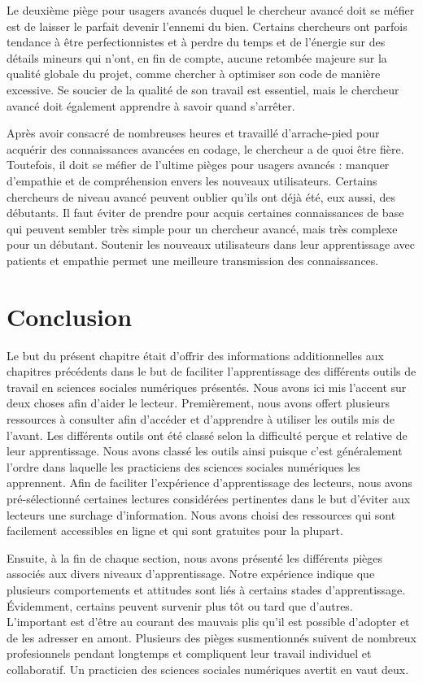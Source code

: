 \documentclass[
  letterpaper,
  DIV=11,
  numbers=noendperiod]{scrreprt}
\begin{document}
Le deuxième piège pour usagers avancés duquel le chercheur avancé doit
se méfier est de laisser le parfait devenir l'ennemi du bien. Certains
chercheurs ont parfois tendance à être perfectionnistes et à perdre du
temps et de l'énergie sur des détails mineurs qui n'ont, en fin de
compte, aucune retombée majeure sur la qualité globale du projet, comme
chercher à optimiser son code de manière excessive. Se soucier de la
qualité de son travail est essentiel, mais le chercheur avancé doit
également apprendre à savoir quand s'arrêter.

Après avoir consacré de nombreuses heures et travaillé d'arrache-pied
pour acquérir des connaissances avancées en codage, le chercheur a de
quoi être fière. Toutefois, il doit se méfier de l'ultime pièges pour
usagers avancés : manquer d'empathie et de compréhension envers les
nouveaux utilisateurs. Certains chercheurs de niveau avancé peuvent
oublier qu'ils ont déjà été, eux aussi, des débutants. Il faut éviter de
prendre pour acquis certaines connaissances de base qui peuvent sembler
très simple pour un chercheur avancé, mais très complexe pour un
débutant. Soutenir les nouveaux utilisateurs dans leur apprentissage
avec patients et empathie permet une meilleure transmission des
connaissances.

\section{Conclusion}\label{conclusion-3}

Le but du présent chapitre était d'offrir des informations
additionnelles aux chapitres précédents dans le but de faciliter
l'apprentissage des différents outils de travail en sciences sociales
numériques présentés. Nous avons ici mis l'accent sur deux choses afin
d'aider le lecteur. Premièrement, nous avons offert plusieurs ressources
à consulter afin d'accéder et d'apprendre à utiliser les outils mis de
l'avant. Les différents outils ont été classé selon la difficulté perçue
et relative de leur apprentissage. Nous avons classé les outils ainsi
puisque c'est généralement l'ordre dans laquelle les practiciens des
sciences sociales numériques les apprennent. Afin de faciliter
l'expérience d'apprentissage des lecteurs, nous avons pré-sélectionné
certaines lectures considérées pertinentes dans le but d'éviter aux
lecteurs une surchage d'information. Nous avons choisi des ressources
qui sont facilement accessibles en ligne et qui sont gratuites pour la
plupart.

Ensuite, à la fin de chaque section, nous avons présenté les différents
pièges associés aux divers niveaux d'apprentissage. Notre expérience
indique que plusieurs comportements et attitudes sont liés à certains
stades d'apprentissage. Évidemment, certains peuvent survenir plus tôt
ou tard que d'autres. L'important est d'être au courant des mauvais plis
qu'il est possible d'adopter et de les adresser en amont. Plusieurs des
pièges susmentionnés suivent de nombreux profesionnels pendant longtemps
et compliquent leur travail individuel et collaboratif. Un practicien
des sciences sociales numériques avertit en vaut deux.
\end{document}
